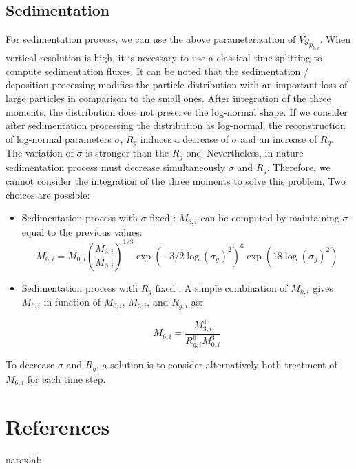 \subsection{Sedimentation}
For sedimentation process, we can use the above parameterization of 
$\hat{Vg}_{p_{k,i}}$. When
vertical resolution is high, it is necessary to use 
a classical time splitting to compute sedimentation fluxes.
It can be noted that the sedimentation / deposition processing modifies the 
particle distribution
with  an important loss of large particles in comparison to the small ones. 
After integration 
of the three moments, the distribution does not preserve the log-normal shape. 
If we consider after 
sedimentation processing the distribution as log-normal, the  
reconstruction of
log-normal parameters $\sigma$, $R_g$ induces a decrease of $\sigma$ and an 
increase of $R_g$. 
The variation of $\sigma$ is stronger than the $R_g$ one. Nevertheless, in nature
sedimentation process must decrease simultaneously  $\sigma$ and $R_g$.
 Therefore, we cannot consider the integration of the 
three moments to solve this problem. Two choices are possible:\\
\begin{itemize}
\item Sedimentation process with $\sigma$ fixed :
$M_{6,i}$ can be computed by maintaining $\sigma$ equal to the previous values:
\begin{equation}
M_{6,i} = M_{0,i} \left(\frac{M_{3,i}}{M_{0,i}} \right)^{1/3}  \exp \left( -3/2 
\log(\sigma_g)^2\right)^6  \exp\left(18 \log(\sigma_g)^2\right)
\label{sigmafix}
\end{equation}

\item Sedimentation process with $R_g$ fixed :
A simple combination of $M_{k,i}$ gives $M_{6,i}$ in function of $M_{0,i}$, 
$M_{3,i}$, and $R_{g,i}$ as:

\begin{equation}
M_{6,i} = \frac{M_{3,i}^4}{R_{g,i}^6 M_{0,i}^3}
\label{rgfix}
\end{equation}

\end{itemize}

To decrease $\sigma$ and $R_g$, a solution is to consider alternatively both treatment of $M_{6,i}$ for each 
time step.


%
\section{References}
\expandafter\ifx\csname natexlab\endcsname\relax\def\natexlab#1{#1}\fi


